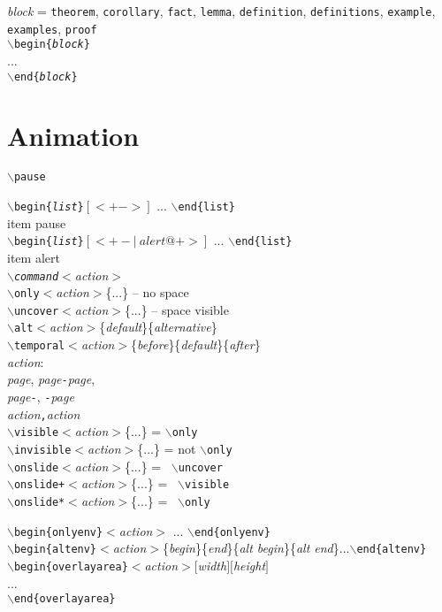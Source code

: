 \documentclass[a4paper,landscape]{article}
\newcommand{\cmd}[1]{\texttt{$\backslash$#1}}
\newcommand{\dobegin}[1]{\texttt{$\backslash$begin\{#1\}}}
\newcommand{\doend}[1]{\texttt{$\backslash$end\{#1\}}}
\newcommand{\tab}{\hspace*{5mm}}
\begin{document}
\begin{multicols*}{3}
\medskip
\textit{block} = \texttt{theorem}, \texttt{corollary}, \texttt{fact}, \texttt{lemma}, \texttt{definition}, \texttt{definitions}, \texttt{example}, \texttt{examples}, \texttt{proof} \\
\dobegin{\textit{block}} \\
	\tab ... \\
\doend{\textit{block}}



\section*{Animation}

\cmd{pause}


\medskip
\dobegin{\textit{list}}$[<+->]$ ... \doend{list} \\
	\tab item pause \\
\dobegin{\textit{list}}$[<+-|~alert@+>]$ ... \doend{list} \\
	\tab item alert \\

\medskip
\cmd{\textit{command}}$<$\textit{action}$>$ \\
\cmd{only}$<$\textit{action}$>$\{...\} -- no space \\
\cmd{uncover}$<$\textit{action}$>$\{...\} -- space visible\\
\cmd{alt}$<$\textit{action}$>$\{\textit{default}\}\{\textit{alternative}\} \\
\cmd{temporal}$<$\textit{action}$>$\{\textit{before}\}\{\textit{default}\}\{\textit{after}\} \\

\medskip
\textit{action}: \\
	\tab \textit{page}, \textit{page}\texttt{-}\textit{page},  \\
	\tab \textit{page}\texttt{-}, \texttt{-}\textit{page} \\
	\tab \textit{action}\texttt{,}\textit{action} \\

\medskip
\cmd{visible}$<$\textit{action}$>$\{...\} = \cmd{only} \\
\cmd{invisible}$<$\textit{action}$>$\{...\} = not \cmd{only} \\

\medskip
\cmd{onslide}$<$\textit{action}$>$\{...\}	=  \cmd{uncover} \\
\cmd{onslide+}$<$\textit{action}$>$\{...\}	=  \cmd{visible} \\
\cmd{onslide*}$<$\textit{action}$>$\{...\}	=  \cmd{only}

\medskip
\dobegin{onlyenv}$<$\textit{action}$>$ ... \doend{onlyenv} \\
\dobegin{altenv}$<$\textit{action}$>$\{\textit{begin}\}\{\textit{end}\}\{\textit{alt begin}\}\{\textit{alt end}\}...\doend{altenv} \\
\dobegin{overlayarea}$<$\textit{action}$>$$[$\textit{width}$]$$[$\textit{height}$]$ \\
	\tab ... \\
\doend{overlayarea}

\end{multicols*}
\end{document}
